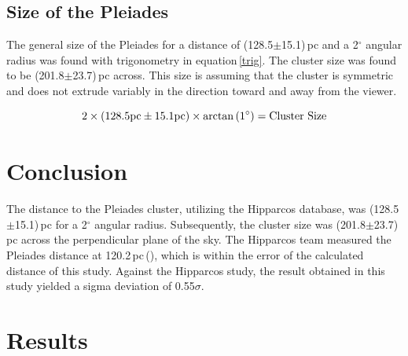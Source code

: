 \documentclass[onecolumn]{aastex6}
\begin{document}
\subsection{Size of the Pleiades}

The general size of the Pleiades for a distance of (128.5$\pm$15.1)\,pc and a 2$^\circ$ angular radius was found with trigonometry in equation\,\ref{trig}. The cluster size was found to be (201.8$\pm$23.7)\,pc across. This size is assuming that the cluster is symmetric and does not extrude variably in the direction toward and away from the viewer.

\begin{equation}
2\times (128.5\textnormal{pc}\pm15.1\textnormal{pc}) \times \arctan{(1^{\circ})} = \textnormal{Cluster Size}
\label{trig}
\end{equation}

\section{Conclusion}

The distance to the Pleiades cluster, utilizing the Hipparcos database, was (128.5$\pm$15.1)\,pc for a 2$^\circ$ angular radius. Subsequently, the cluster size was (201.8$\pm$23.7)\,pc across the perpendicular plane of the sky. The Hipparcos team measured the Pleiades distance at 120.2\,pc\,(\cite{3}), which is within the error of the calculated distance of this study. Against the Hipparcos study, the result obtained in this study yielded a sigma deviation of 0.55$\sigma$.





\clearpage
\section{Results}
\end{document}
